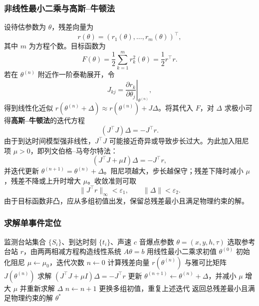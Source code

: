 \documentclass[12pt,a4paper]{article}
\begin{document}
\subsubsection{非线性最小二乘与高斯--牛顿法}

设待估参数为 $\theta$，残差向量为
\[
r(\theta)=\left(r_1(\theta),\dots,r_m(\theta)\right)^\top,
\]
其中 $m$ 为方程个数。目标函数为
\[
F(\theta)=\frac12\sum_{k=1}^{m}r_k^2(\theta)=\frac12 r^\top r.
\]
若在 $\theta^{(n)}$ 附近作一阶泰勒展开，令
\[
J_{kj}=\left.\frac{\partial r_k}{\partial \theta_j}\right|_{\theta^{(n)}},
\]
得到线性化近似 $r(\theta^{(n)}+\Delta)\approx r(\theta^{(n)})+J\Delta$。将其代入 $F$，对 $\Delta$ 求极小可得\textbf{高斯--牛顿法}的迭代方程
\begin{equation}
\left(J^\top J\right)\Delta=-J^\top r.
\end{equation}
由于到达时间模型强非线性，$J^\top J$ 可能接近奇异或导致步长过大。为此加入阻尼项 $\mu>0$，即列文伯格--马夸尔特法：
\begin{equation}
\left(J^\top J+\mu I\right)\Delta=-J^\top r,
\end{equation}
并迭代更新 $\theta^{(n+1)}=\theta^{(n)}+\Delta$。阻尼项越大，步长越保守；残差下降时减小 $\mu$，残差不降或上升时增大 $\mu$。收敛准则可取
\[
\|J^\top r\|_{\infty}<\varepsilon_1,\qquad
\|\Delta\|<\varepsilon_2.
\]
由于目标函数非凸，应从多组初值出发，保留总残差最小且满足物理约束的解。

\subsubsection{求解单事件定位}

\begin{algorithm}[H]
\caption{单事件定位：线性初值 + 列文伯格--马夸尔特迭代精化}
\label{alg:single}
\begin{algorithmic}[1]
\Require 监测台站集合 $\{S_i\}$、到达时刻 $\{t_i\}$、声速 $c$
\Ensure 音爆点参数 $\theta=(x,y,h,\tau)$
\State 选取参考台站 $r$，由两两相减方程构造线性系统 $A\theta=b$
\State 用线性最小二乘求初值 $\theta^{(0)}$
\State 初始化阻尼 $\mu\leftarrow\mu_0$，迭代次数 $n\leftarrow0$
\Repeat
  \State 计算残差向量 $r(\theta^{(n)})$ 与雅可比矩阵 $J(\theta^{(n)})$
  \State 求解 $(J^{\top}J+\mu I)\Delta=-J^{\top}r$
    \State 更新 $\theta^{(n+1)}\leftarrow\theta^{(n)}+\Delta$，并减小 $\mu$
  \Else
    \State 增大 $\mu$ 并重新求解 $\Delta$
  \EndIf
  \State $n\leftarrow n+1$
\State 更换多组初值，重复上述迭代
\State 返回总残差最小且满足物理约束的解 $\theta^{*}$
\end{algorithmic}
\end{algorithm}
\end{document}
